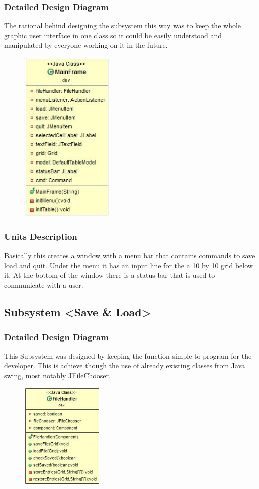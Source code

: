 \documentclass[12pt]{article}
\begin{document}
\subsubsection{Detailed Design Diagram}
The rational behind designing the subsystem this way was to keep the whole graphic user interface in one class so it could be easily understood and manipulated by everyone working on it in the future.
\begin{figure}[ht!]
\centering
\includegraphics[width=45mm]{SS2_GUI.jpg}
\end{figure}

\subsubsection{Units Description}
Basically this creates a window with a menu bar that contains commands to save load and quit. Under the menu it has an input line for the a 10 by 10 grid below it. At the bottom of the window there is a status bar that is used to communicate with a user. 

\subsection{Subsystem \textless Save \& Load\textgreater}
\subsubsection{Detailed Design Diagram}
This Subsystem was designed by keeping the function simple to program for the developer. This is achieve though the use of already existing classes from Java swing, most notably JFileChooser.
\begin{figure}[ht!]
\centering
\includegraphics[width=40mm]{SS3_SaveLoad.jpg}
\end{figure}
\end{document}
